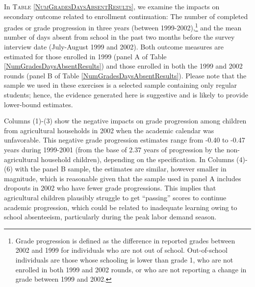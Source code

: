 \documentclass[12pt,letterpaper]{article}
\newcommand{\SAdded}[1]{\textcolor{red}{#1}}
\newcommand{\0}{\ensuremath{\mbox{\boldmath $0$}}}
\begin{document}
In \textsc{\small Table \ref{NumGradesDaysAbsentResults}}, we examine the impacts on secondary outcome related to enrollment continuation: The number of completed grades or grade progression in three years (between 1999-2002),\footnote{Grade progression is defined as the difference in reported grades between 2002 and 1999 for individuals who are not out of school. Out-of-school individuals are those whose schooling is lower than grade 1, who are not enrolled in both 1999 and 2002 rounds, or who are not reporting a change in grade between 1999 and 2002.} and the mean number of days absent from school in the past two months before the survey interview date (July-August 1999 and 2002). Both outcome measures are estimated for those enrolled in 1999 (panel A of Table \ref{NumGradesDaysAbsentResults}) and those enrolled in both the 1999 and 2002 rounds (panel B of Table \ref{NumGradesDaysAbsentResults}). Please note that the sample we used in these exercises is a selected sample containing only regular students; hence, the evidence generated here is suggestive and is likely to provide lower-bound estimates.  

Columns (1)-(3) show the negative impacts on grade progression among children from agricultural households in 2002 when the academic calendar was unfavorable. This negative grade progression estimates range from -0.40 to -0.47 years during 1999-2001 (from the base of 2.37 years of progression by the non-agricultural household children), depending on the specification. In Columns (4)-(6) with the panel B sample, the estimates are similar, however smaller in magnitude, which is reasonable given that the sample used in panel A includes dropouts in 2002 who have fewer grade progressions. This implies that agricultural children plausibly struggle to get ``passing'' scores to continue academic progression, which could be related to inadequate learning owing to school absenteeism, particularly during the peak labor demand season. 



 


\end{document}
